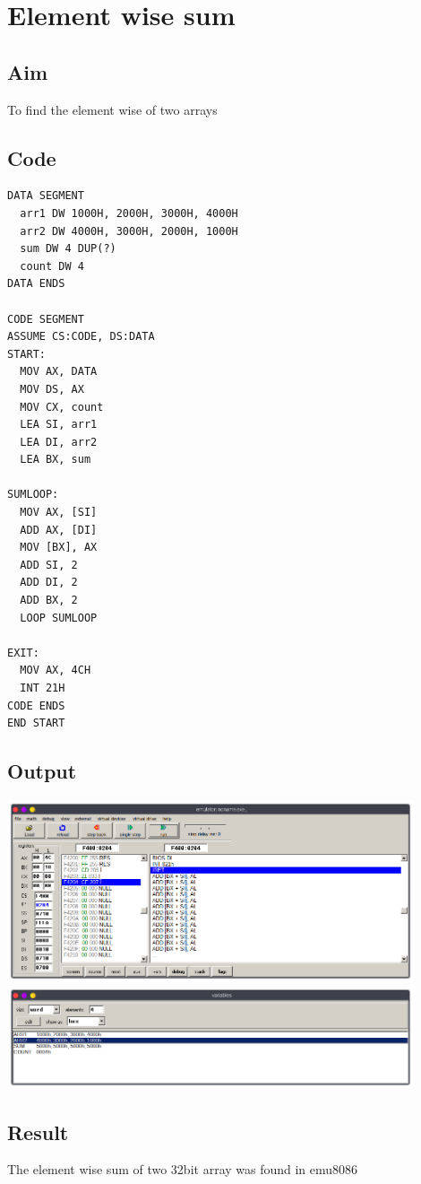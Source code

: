 \section{Element wise sum}
\subsection{Aim}
To find the element wise of two arrays

\subsection{Code}
\begin{lstlisting}
DATA SEGMENT
  arr1 DW 1000H, 2000H, 3000H, 4000H
  arr2 DW 4000H, 3000H, 2000H, 1000H
  sum DW 4 DUP(?)
  count DW 4
DATA ENDS

CODE SEGMENT
ASSUME CS:CODE, DS:DATA
START:
  MOV AX, DATA
  MOV DS, AX
  MOV CX, count
  LEA SI, arr1
  LEA DI, arr2
  LEA BX, sum

SUMLOOP:
  MOV AX, [SI]
  ADD AX, [DI]
  MOV [BX], AX
  ADD SI, 2
  ADD DI, 2
  ADD BX, 2
  LOOP SUMLOOP

EXIT:
  MOV AX, 4CH
  INT 21H
CODE ENDS
END START
\end{lstlisting}

\subsection{Output}
\begin{center}
	\includegraphics[width=0.90\textwidth]{img/p8/ss1.png}
	\includegraphics[width=0.90\textwidth]{img/p8/ss2.png}
\end{center}

\subsection{Result}
The element wise sum of two 32bit array was found in emu8086